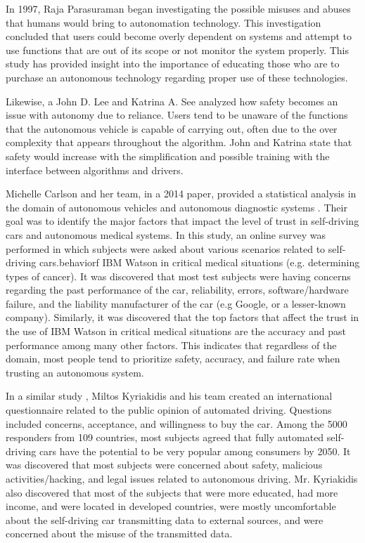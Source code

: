 \documentclass[runningheads,a4paper]{llncs}
\begin{document}
In 1997, Raja Parasuraman began investigating the possible misuses and abuses that humans would bring to autonomation technology\cite{parasuraman1997humans}.  This investigation concluded that users could become overly dependent on systems and attempt to use functions that are out of its scope or not monitor the system properly.  This study has provided insight into the importance of educating those who are to purchase an autonomous technology regarding proper use of these technologies.

Likewise, a John D. Lee and Katrina A. See analyzed how safety becomes an issue with autonomy due to reliance\cite{lee2004trust}.  Users tend to be unaware of the functions that the autonomous vehicle is capable of carrying out, often due to the over complexity that appears throughout the algorithm.  John and Katrina state that safety would increase with the simplification and possible training with the interface between algorithms and drivers. 

Michelle Carlson and her team, in a 2014 paper, provided a statistical analysis in the domain of autonomous vehicles and autonomous diagnostic systems \cite{carlson2014identifying}. Their goal was to identify the major factors that impact the level of trust in self-driving cars and autonomous medical systems. In this study, an online survey was performed in which subjects were asked about various scenarios related to self-driving cars.behaviorf IBM Watson in critical medical situations (e.g. determining types of cancer). It was discovered that most test subjects were having concerns regarding the past performance of the car, reliability, errors, software/hardware failure, and the liability manufacturer of the car (e.g Google, or a lesser-known company). Similarly, it was discovered that the top factors that affect the trust in the use of IBM Watson in critical medical situations are the accuracy and past performance among many other factors. This indicates that regardless of the domain, most people tend to prioritize safety, accuracy, and failure rate when trusting an autonomous system.

In a similar study \cite{kyriakidis2015public}, Miltos Kyriakidis and his team created an international questionnaire related to the public opinion of automated driving. Questions included concerns, acceptance, and willingness to buy the car. Among the 5000 responders from 109 countries, most subjects agreed that fully automated self-driving cars have the potential to be very popular among consumers by 2050. It was discovered that most subjects were concerned about safety, malicious activities/hacking, and legal issues related to autonomous driving. Mr. Kyriakidis also discovered that most of the subjects that were more educated, had more income, and were located in developed countries, were mostly uncomfortable about the self-driving car transmitting data to external sources, and were concerned about the misuse of the transmitted data.
\end{document}
